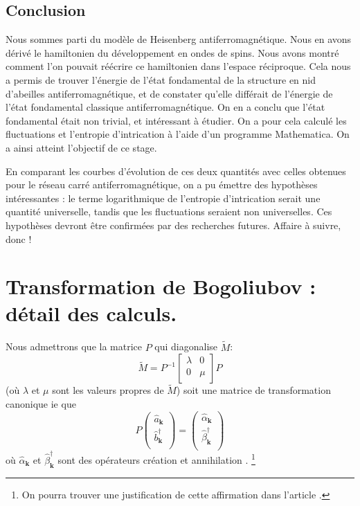 \documentclass[a4paper, french]{report}
\newcommand{\an}{\hat{a}}
\newcommand{\blbl}{création et annihilation }
\newcommand{\bcre}{\hat{b}^\dagger}
\newcommand{\ond}{\ensuremath{\mathbf{k}\xspace}}
\newcommand{\alan}{\hat{\alpha}_{\ond}}
\newcommand{\betcre}{\hat{\beta}^\dagger_{\ond}}
\newcommand{\1}{\ensuremath{\ket{\om_1\bom_1}}\xspace}
\newcommand{\2}{\ensuremath{\ket{\om_2\bom_2}}\xspace}
\newcommand{\tilm}{\ensuremath{\tilde{M}}\xspace}
\begin{document}
\section*{\Huge Conclusion}
Nous sommes parti du modèle de Heisenberg antiferromagnétique. Nous en avons dérivé le hamiltonien du développement en ondes de spins. Nous avons montré comment l'on pouvait réécrire ce hamiltonien dans l'espace réciproque. Cela nous a permis de trouver l'énergie de l'état fondamental de la structure en nid d'abeilles antiferromagnétique, et de constater qu'elle différait de l'énergie de l'état fondamental classique antiferromagnétique. On en a conclu que l'état fondamental était non trivial, et intéressant à étudier. On a pour cela calculé les fluctuations et l'entropie d'intrication à l'aide d'un programme Mathematica. On a ainsi atteint l'objectif de ce stage.

En comparant les courbes d'évolution de ces deux quantités avec celles obtenues pour le réseau carré antiferromagnétique, on a pu émettre des hypothèses intéressantes : le terme logarithmique de l'entropie d'intrication serait une quantité universelle, tandis que les fluctuations seraient non universelles.
Ces hypothèses devront être confirmées par des recherches futures. Affaire à suivre, donc !
{}


\appendix

\chapter{Transformation de Bogoliubov : détail des calculs.}
Nous admettrons que la matrice $P$ qui diagonalise \tilm :
\begin{equation}
	\tilm=P^{-1}\begin{bmatrix}
	\lambda & 0\\
	0 & \mu\\
\end{bmatrix}P
\label{eq:bog1}
\end{equation}
(où $\lambda$ et $\mu$ sont les valeurs propres de \tilm) soit une matrice de transformation canonique ie que
\[
	P \begin{pmatrix}
	\an_\ond \\
	\bcre_\ond \\
\end{pmatrix}=\begin{pmatrix}
	\alan\\
	\betcre\\
\end{pmatrix}
\]
où $\alan$ et $\betcre$ sont des opérateurs \blbl. \footnote{On pourra trouver une justification de cette affirmation dans l'article \cite{bogo}.}
\end{document}
